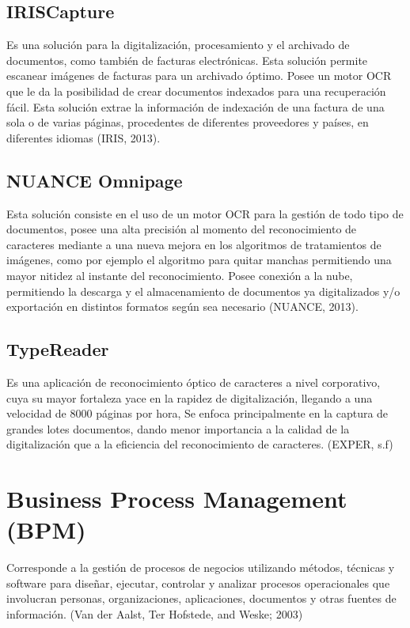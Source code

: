 	    \subsection{IRISCapture}
		Es una solución para la digitalización, procesamiento y el archivado de documentos, como también de  facturas electrónicas. Esta solución permite escanear imágenes de facturas para un archivado óptimo. Posee un motor OCR que le da la posibilidad de crear documentos indexados para una recuperación fácil. Esta solución extrae la información de indexación de una factura de una sola o de varias páginas, procedentes de diferentes proveedores y países, en diferentes idiomas (IRIS, 2013).
		
		\subsection{NUANCE Omnipage}
		Esta solución consiste en el uso de un motor OCR para la gestión de todo tipo  de documentos, posee una alta precisión al momento del reconocimiento de caracteres mediante a una nueva mejora en los algoritmos de tratamientos de imágenes, como por ejemplo el algoritmo para quitar manchas permitiendo una mayor nitidez al instante del reconocimiento. Posee conexión a la nube, permitiendo la descarga y el almacenamiento de documentos ya digitalizados y/o exportación en distintos formatos según sea necesario (NUANCE, 2013).
	
		\subsection{TypeReader}
		Es una aplicación de reconocimiento óptico de caracteres a nivel corporativo, cuya su mayor fortaleza yace en la rapidez de digitalización, llegando a una velocidad de 8000 páginas por hora, Se enfoca principalmente en la captura de grandes lotes documentos, dando menor importancia a la calidad de la digitalización que a la eficiencia del reconocimiento de caracteres.
		(EXPER, s.f)
	\section{Business Process Management (BPM)}
	Corresponde a la gestión de procesos de negocios utilizando métodos, técnicas y software para diseñar, ejecutar, controlar y analizar procesos operacionales que involucran personas, organizaciones, aplicaciones, documentos y otras fuentes de información. (Van der Aalst, Ter Hofstede, and Weske; 2003)
	
